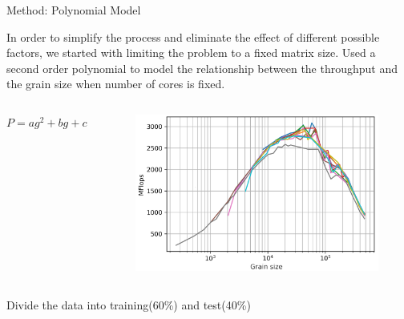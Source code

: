 \documentclass[10pt]{beamer}
\begin{document}
\begin{frame}{Method: Polynomial Model}
	\begin{outline}
		
		In order to simplify the process and eliminate the effect of different possible factors, we started with limiting the problem to a fixed matrix size.	
		\1Used a second order polynomial to model the relationship between the throughput and the grain size when number of cores is fixed.
		\begin{columns}		
		 \centering$P=ag^2+bg+c$ 
		 \begin{figure}[]
		 \includegraphics[scale=0.15]{images/fig6_cropped.png}
		 \end{figure}
		 
		\end{columns}
	\1Divide the data into training(60\%) and test(40\%)
	\end{outline}
\end{frame}
\end{document}
